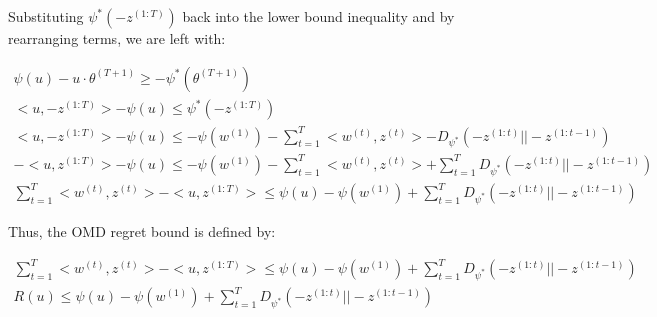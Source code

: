 \documentclass[11pt]{article}
\begin{document}
Substituting $\psi^* (-z^{(1:T)})$ back into the lower bound inequality and by rearranging terms, we are left with:

\begin{gather*}
    \psi (u) - u \cdot \theta^{(T+1)} \geq -\psi^* (\theta^{(T+1)}) \\ 
     <u, -z^{(1:T)} > - \psi (u) \leq \psi^* (-z^{(1:T)}) \\ 
     <u, -z^{(1:T)} > - \psi (u) \leq -\psi (w^{(1)}) - \sum_{t=1}^T <w^{(t)}, z^{(t)}> - D_{\psi^*} (-z^{(1:t)}||-z^{(1:t-1)}) \\ 
     -<u, z^{(1:T)} > - \psi (u) \leq -\psi (w^{(1)}) - \sum_{t=1}^T <w^{(t)}, z^{(t)}> + \sum_{t=1}^T D_{\psi^*} (-z^{(1:t)}||-z^{(1:t-1)}) \\ 
     \sum_{t=1}^T <w^{(t)}, z^{(t)}> - <u, z^{(1:T)} > \leq \psi (u) - \psi (w^{(1)}) + \sum_{t=1}^T D_{\psi^*} (-z^{(1:t)}||-z^{(1:t-1)}) 
\end{gather*}

Thus, the OMD regret bound is defined by:

\begin{gather*}
    \sum_{t=1}^T <w^{(t)}, z^{(t)}> - <u, z^{(1:T)} > \leq \psi (u) - \psi (w^{(1)}) + \sum_{t=1}^T D_{\psi^*} (-z^{(1:t)}||-z^{(1:t-1)})  \\ 
    R(u) \leq \psi (u) - \psi (w^{(1)}) + \sum_{t=1}^T D_{\psi^*} (-z^{(1:t)}||-z^{(1:t-1)}) \\
\end{gather*}

\newpage
 



\end{document}
